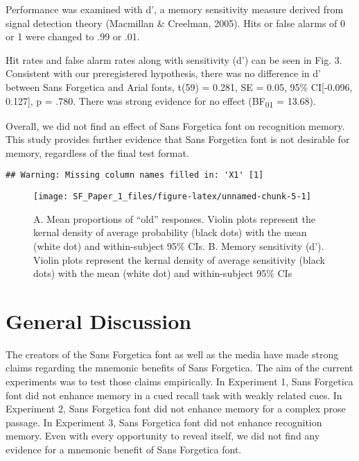 \documentclass[jou]{apa6}
\begin{document}
Performance was examined with d', a memory sensitivity measure derived from signal detection theory (Macmillan \& Creelman, 2005). Hits or false alarms of 0 or 1 were changed to .99 or .01.

Hit rates and false alarm rates along with sensitivity (d') can be seen in Fig. 3. Consistent with our preregistered hypothesis, there was no difference in d' between Sans Forgetica and Arial fonts, t(59) = 0.281, SE = 0.05, 95\% CI{[}-0.096, 0.127{]}, p = .780. There was strong evidence for no effect (BF\textsubscript{01} = 13.68).

Overall, we did not find an effect of Sans Forgetica font on recognition memory. This study provides further evidence that Sans Forgetica font is not desirable for memory, regardless of the final test format.

\begin{verbatim}
## Warning: Missing column names filled in: 'X1' [1]
\end{verbatim}

\begin{figure}

{\centering \texttt{[image: SF\_Paper\_1\_files/figure-latex/unnamed-chunk-5-1]} 

}

\caption{A. Mean proportions of “old” responses. Violin plots represent the kernal density of average probability (black dots) with the mean (white dot) and within-subject 95\% CIs. B. Memory sensitivity (d'). Violin plots represent the kernal density of average sensitivity (black dots) with the mean (white dot) and within-subject 95\% CIs }\label{fig:unnamed-chunk-5}
\end{figure}

\hypertarget{general-discussion}{%
\section{General Discussion}\label{general-discussion}}

The creators of the Sans Forgetica font as well as the media have made strong claims regarding the mnemonic benefits of Sans Forgetica. The aim of the current experiments was to test those claims empirically. In Experiment 1, Sans Forgetica font did not enhance memory in a cued recall task with weakly related cues. In Experiment 2, Sans Forgetica font did not enhance memory for a complex prose passage. In Experiment 3, Sans Forgetica font did not enhance recognition memory. Even with every opportunity to reveal itself, we did not find any evidence for a mnemonic benefit of Sans Forgetica font.
\end{document}
